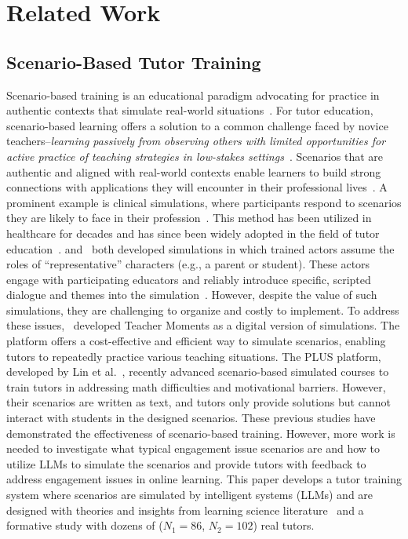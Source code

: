 \section{Related Work}
\label{sec:related_worl}

\subsection{Scenario-Based Tutor Training}



Scenario-based training is an educational paradigm advocating for practice in authentic contexts that simulate real-world situations~\cite{preservice}.
For tutor education, scenario-based learning offers a solution to a common challenge faced by novice teachers--\textit{learning passively from observing others with limited opportunities for active practice of teaching strategies in low-stakes settings}~\cite{prospectsforchange}.
Scenarios that are authentic and aligned with real-world contexts enable learners to build strong connections with applications they will encounter in their professional lives~\cite{teachingearly}.
A prominent example is clinical simulations, where participants respond to scenarios they are likely to face in their profession~\cite{dotger2013had,teachermoments}. This method has been utilized in healthcare for decades and has since been widely adopted in the field of tutor education~\cite{teachermoments,simulationbasedlearning}. \citet{dotger2013had} and~\citet{designingandusing} both developed simulations in which trained actors assume the roles of ``representative'' characters (e.g., a parent or student). These actors engage with participating educators and reliably introduce specific, scripted dialogue and themes into the simulation~\cite{dotger2013had,clinicalsimulations}. However, despite the value of such simulations, they are challenging to organize and costly to implement. To address these issues,~\citet{teachermoments} developed Teacher Moments as a digital version of simulations. The platform offers a cost-effective and efficient way to simulate scenarios, enabling tutors to repeatedly practice various teaching situations. The PLUS platform, developed by Lin et al.~\cite{developmentofscenario, whenthetutorbecomes,usinglarge,personalizedlearning}, recently advanced scenario-based simulated courses to train tutors in addressing math difficulties and motivational barriers. However, their scenarios are written as text, and tutors only provide solutions but cannot interact with students in the designed scenarios.
%
These previous studies have demonstrated the effectiveness of scenario-based training. However, more work is needed to investigate what typical engagement issue scenarios are and how to utilize LLMs to simulate the scenarios and provide tutors with feedback to address engagement issues in online learning. This paper develops a tutor training system where scenarios are simulated by intelligent systems (LLMs) and are designed with theories and insights from learning science literature~\cite{casestudy, abou2021emergency, enhancing,sevenprinciples,motivation} and a formative study with dozens of ($N_1=86$, $N_2=102$) real tutors. 

